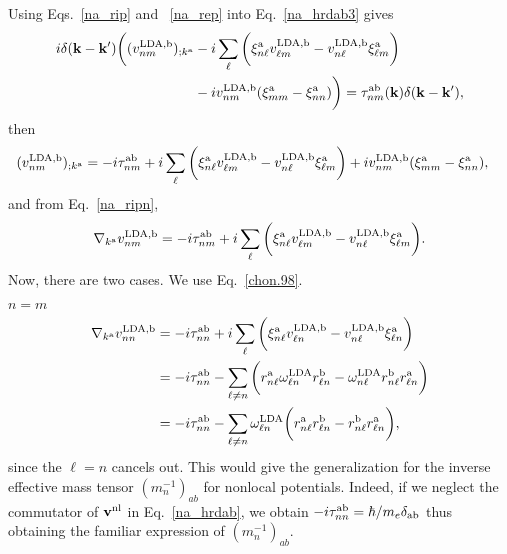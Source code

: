 Using Eqs.~\eqref{na_rip} and ~\eqref{na_rep}
into Eq.~\eqref{na_hrdab3} gives
\begin{align}\label{na_rapb}
i\delta(\mathbf{k}-\mathbf{k}')
\bigg(
(v^{\mathrm{LDA},\mathrm{b}}_{nm})_{;k^{\mathrm{a}}}
&
-i
\sum_{\ell}
\bigg(
\xi^{\mathrm{a}}_{n\ell}
v^{\mathrm{LDA},\mathrm{b}}_{\ell m}
-
v^{\mathrm{LDA},\mathrm{b}}_{n\ell}
\xi^{\mathrm{a}}_{\ell m}
\bigg)
\nonumber \\
&
-i
v^{\mathrm{LDA},\mathrm{b}}_{nm}(\xi^{\mathrm{a}}_{mm}
-
\xi^{\mathrm{a}}_{nn}
)
\bigg)
=
\tau^{\mathrm{a}\mathrm{b}}_{nm}(\mathbf{k})\delta(\mathbf{k}-\mathbf{k}')
,
\end{align}
then
\begin{align}\label{na_rapb2}
(v^{\mathrm{LDA},\mathrm{b}}_{nm})_{;k^{\mathrm{a}}}&=
-i
\tau^{\mathrm{a}\mathrm{b}}_{nm}
+i
\sum_{\ell}
\bigg(
\xi^{\mathrm{a}}_{n\ell}
v^{\mathrm{LDA},\mathrm{b}}_{\ell m}
-
v^{\mathrm{LDA},\mathrm{b}}_{n\ell}
\xi^{\mathrm{a}}_{\ell m}
\bigg)
+i
v^{\mathrm{LDA},\mathrm{b}}_{nm}(\xi^{\mathrm{a}}_{mm}
-
\xi^{\mathrm{a}}_{nn}
)
,
\end{align}
and from Eq.~\eqref{na_ripn},
\begin{align}\label{ncogno}
\nabla_{k^{\mathrm{a}}}v^{\mathrm{LDA},\mathrm{b}}_{nm}=
-i\tau^{\mathrm{a}\mathrm{b}}_{nm}
+i
\sum_{\ell}
\bigg(
\xi^{\mathrm{a}}_{n\ell}
v^{\mathrm{LDA},\mathrm{b}}_{\ell m}
-
v^{\mathrm{LDA},\mathrm{b}}_{n\ell}
\xi^{\mathrm{a}}_{\ell m}
\bigg)
.
\end{align}
Now, there are two cases. We use Eq.~\eqref{chon.98}.

 $n=m$
\begin{align}\label{ntita}
\nabla_{k^{\mathrm{a}}}v^{\mathrm{LDA},\mathrm{b}}_{nn}&=
-i\tau^{\mathrm{a}\mathrm{b}}_{nn}
+i
\sum_{\ell}
\bigg(
\xi^{\mathrm{a}}_{n\ell}
v^{\mathrm{LDA},\mathrm{b}}_{\ell n}
-
v^{\mathrm{LDA},\mathrm{b}}_{n\ell}
\xi^{\mathrm{a}}_{\ell n}
\bigg)
\nonumber\\
&=
-i\tau^{\mathrm{a}\mathrm{b}}_{nn}
-
\sum_{\ell\ne n}
\bigg(
r^{\mathrm{a}}_{n\ell}
\omega^{\mathrm{LDA}}_{\ell n}
r^{\mathrm{b}}_{\ell n}
-
\omega^{\mathrm{LDA}}_{n\ell}
r^{\mathrm{b}}_{n\ell}
r^{\mathrm{a}}_{\ell n}
\bigg)
\nonumber\\
&=
-i\tau^{\mathrm{a}\mathrm{b}}_{nn}
-
\sum_{\ell\ne n}
\omega^{\mathrm{LDA}}_{\ell n}
\bigg(
r^{\mathrm{a}}_{n\ell}
r^{\mathrm{b}}_{\ell n}
-
r^{\mathrm{b}}_{n\ell}
r^{\mathrm{a}}_{\ell n}
\bigg)
,
\end{align}
since the $\ell=n$ cancels out. 
This
would give the generalization for the inverse effective mass
tensor $(m_n^{-1})_{ab}$ for nonlocal potentials.
Indeed, if we neglect the commutator of $\mathbf{v}^{\mathrm{nl}}$ in
Eq.~\eqref{na_hrdab}, we obtain 
$-i\tau^{\mathrm{a}\mathrm{b}}_{nn}=\hbar/m_e\delta_{\mathrm{a}\mathrm{b}}$
thus obtaining the  familiar expression of $(m_n^{-1})_{ab}$.\cite{ashcroft_solid_1976}

